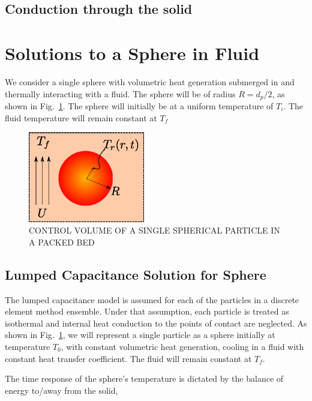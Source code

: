 \subsection{Conduction through the solid}\label{sec:ht-jeffreson-correction}


\section{Solutions to a Sphere in Fluid}

We consider a single sphere with volumetric heat generation submerged in and thermally interacting with a fluid. The sphere will be of radius $R=d_p/2$, as shown in Fig.~\ref{fig:ParticleControlVolume}. The sphere will initially be at a uniform temperature of $T_i$. The fluid temperature will remain constant at $T_f$

\begin{figure}[ht]
	\centering
		\includegraphics[width=2in]{chapters/figures/ParticleControlVolume}
	\caption[Control volume of single spherical particle in a packed bed]{CONTROL VOLUME OF A SINGLE SPHERICAL PARTICLE IN A PACKED BED}
	\label{fig:ParticleControlVolume}
\end{figure}


\subsection{Lumped Capacitance Solution for Sphere}\label{sec:lumped-capacitance}
The lumped capacitance model is assumed for each of the particles in a discrete element method ensemble. Under that assumption, each particle is treated as isothermal and internal heat conduction to the points of contact are neglected. As shown in Fig.~\ref{fig:ParticleControlVolume}, we will represent a single particle as a sphere initially at temperature $T_0$, with constant volumetric heat generation, cooling in a fluid with constant heat transfer coefficient. The fluid will remain constant at $T_f$.

The time response of the sphere's temperature is dictated by the balance of energy to/away from the solid,  


